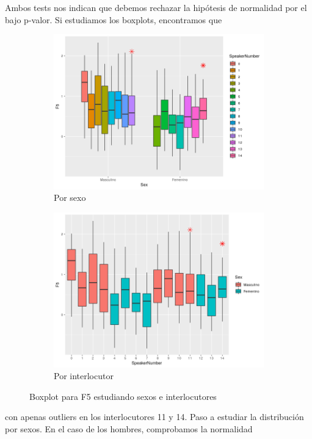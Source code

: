 Ambos tests nos indican que debemos rechazar la hipótesis de normalidad por el bajo p-valor. Si estudiamos los boxplots, encontramos que

\begin{figure}[H]
	\centering
	\begin{subfigure}{.5\textwidth}
		\centering
		\includegraphics[width=.9\linewidth]{bps5.png}
		\caption{Por sexo}
		\label{fig:bps5}
	\end{subfigure}%
	\begin{subfigure}{.5\textwidth}
		\centering
		\includegraphics[width=.9\linewidth]{bpsn5.png}
		\caption{Por interlocutor}
		\label{fig:bpsn5}
	\end{subfigure}
	\caption{Boxplot para F5 estudiando sexos e interlocutores}
	\label{fig:bf5}
\end{figure}

con apenas outliers en los interlocutores 11 y 14. Paso a estudiar la distribución por sexos. En el caso de los hombres, comprobamos la normalidad

